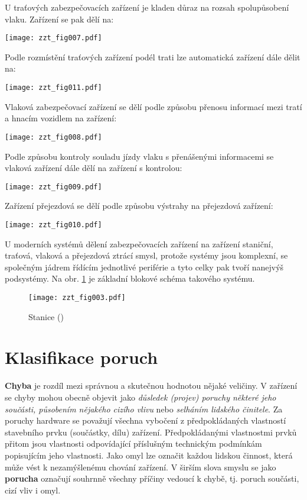 \begin{center}
  U traťových zabezpečovacích zařízení je kladen důraz na rozsah spolupůsobení vlaku. Zařízení se
  pak dělí na:
  \begin{center}
    \texttt{[image: zzt\_fig007.pdf]}
  \end{center}
  Podle rozmístění traťových zařízení podél trati lze automatická zařízení dále dělit na:
  \begin{center}
    \texttt{[image: zzt\_fig011.pdf]}
  \end{center}
  Vlaková zabezpečovací zařízení se dělí podle způsobu přenosu informací mezi tratí a hnacím
  vozidlem na zařízení:
  \begin{center}
    \texttt{[image: zzt\_fig008.pdf]}
  \end{center}

  Podle způsobu kontroly souladu jízdy vlaku s přenášenými informacemi se vlaková zařízení dále 
  dělí na zařízení s kontrolou:
  \begin{center}
    \texttt{[image: zzt\_fig009.pdf]}
  \end{center}
  
  Zařízení přejezdová se dělí podle způsobu výstrahy na přejezdová zařízení:
  \begin{center}
    \texttt{[image: zzt\_fig010.pdf]}
  \end{center}
  
  U moderních systémů dělení zabezpečovacích zařízení na zařízení staniční, traťová, vlaková a
  přejezdová ztrácí smysl, protože systémy jsou komplexní, se společným jádrem řídícím jednotlivé 
  periférie a tyto celky pak tvoří nanejvýš podsystémy. Na obr. \ref{zzt:fig003} je základní 
  blokové schéma takového systému. 
  \begin{figure}[ht!] %
    \centering
    \texttt{[image: zzt\_fig003.pdf]}
    \caption{Stanice
             (\cite[s.~11]{Chudacek2005})}
    \label{zzt:fig003}
  \end{figure}


  \section{Klasifikace poruch}
    \textbf{Chyba} je rozdíl mezi správnou a skutečnou hodnotou nějaké veličiny. V zařízení se 
    chyby mohou obecně objevit jako \emph{důsledek (projev) poruchy některé jeho součásti, 
    působením nějakého cizího vlivu} nebo \emph{selháním lidského činitele}. Za poruchy hardware se 
    považují všechna vybočení z předpokládaných vlastností stavebního prvku (součástky, dílu) 
    zařízení. Předpokládanými vlastnostmi prvků přitom jsou vlastnosti odpovídající příslušným 
    technickým podmínkám popisujícím jeho vlastnosti. Jako omyl lze označit každou lidskou činnost, 
    která může vést k nezamýšlenému chování zařízení. V širším slova smyslu se jako 
    \textbf{porucha} označují souhrnně všechny příčiny vedoucí k chybě, tj. poruch součásti, 
    cizí vliv i omyl.


\end{center}
